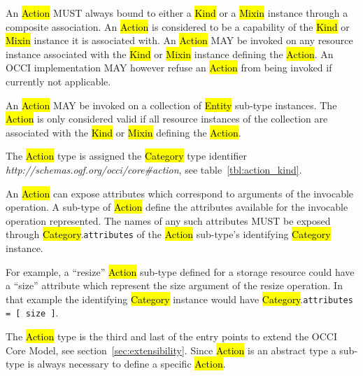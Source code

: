 \documentclass[10pt,a4paper]{article}
\begin{document}
An \hl{Action} MUST always bound to either a \hl{Kind} or a \hl{Mixin}
instance through a composite association. An \hl{Action} is considered
to be a capability of the \hl{Kind} or \hl{Mixin} instance it is
associated with.  An \hl{Action} MAY be invoked on any resource
instance associated with the \hl{Kind} or \hl{Mixin} instance defining
the \hl{Action}. An OCCI implementation MAY however refuse an
\hl{Action} from being invoked if currently not applicable.

An \hl{Action} MAY be invoked on a collection of \hl{Entity} sub-type
instances. The \hl{Action} is only considered valid if all resource
instances of the collection are associated with the \hl{Kind} or
\hl{Mixin} defining the \hl{Action}.


The \hl{Action} type is assigned the \hl{Category} type identifier
\textit{http://schemas.ogf.org/occi/core\#action}, see
table~\ref{tbl:action_kind}.

An \hl{Action} can expose attributes which correspond to arguments of
the invocable operation.  A sub-type of \hl{Action} define the
attributes available for the invocable operation represented. The
names of any such attributes MUST be exposed through
\hl{Category}.{\tt attributes} of the \hl{Action} sub-type's
identifying \hl{Category} instance.

For example, a ``resize'' \hl{Action} sub-type defined for a storage
resource could have a ``size'' attribute which represent the size
argument of the resize operation. In that example the identifying
\hl{Category} instance would have \hl{Category}.{\tt attributes = [
    size ]}.

The \hl{Action} type is the third and last of the entry points to
extend the OCCI Core Model, see section~\ref{sec:extensibility}. Since
\hl{Action} is an abstract type a sub-type is always necessary to
define a specific \hl{Action}.
\end{document}
